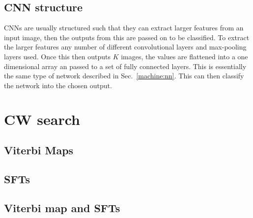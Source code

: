 \subsection{CNN structure}

\acp{CNN} are usually structured such that they can extract larger features from an input image, then the outputs from this are passed on to be classified.
To extract the larger features any number of different convolutional layers and max-pooling layers used.
Once this then outputs $K$ images, the values are flattened into a one dimensional array an passed to a set of fully connected layers. 
This is essentially the same type of network described in Sec.~\ref{machine:nn}.
This can then classify the network into the chosen output.


\section{CW search}

\subsection{Viterbi Maps}

\subsection{SFTs}

\subsection{Viterbi map and SFTs}
